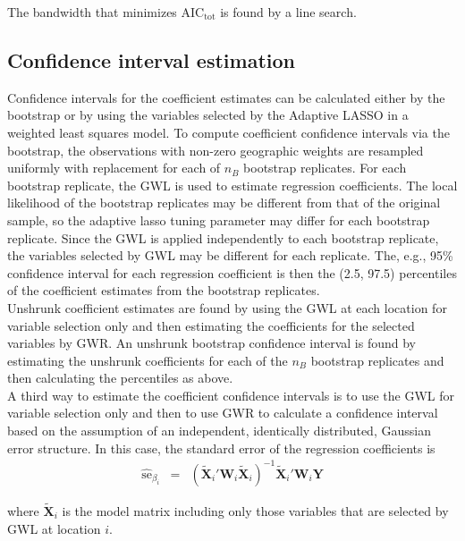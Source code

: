 \documentclass[authoryear, review, 11pt]{elsarticle}
\begin{document}
	The bandwidth that minimizes $\mbox{AIC}_{\mbox{tot}}$ is found by a line search.\\
	
	\subsection{Confidence interval estimation}
	 Confidence intervals for the coefficient estimates can be calculated either by the bootstrap \citep{Efron:1986} or by using the variables selected by the Adaptive LASSO in a weighted least squares model. To compute coefficient confidence intervals via the bootstrap, the observations with non-zero geographic weights are resampled uniformly with replacement for each of $n_B$ bootstrap replicates. For each bootstrap replicate, the GWL is used to estimate regression coefficients. The local likelihood of the bootstrap replicates may be different from that of the original sample, so the adaptive lasso tuning parameter may differ for each bootstrap replicate. Since the GWL is applied independently to each bootstrap replicate, the variables selected by GWL may be different for each replicate. The, e.g., 95\% confidence interval for each regression coefficient is then the (2.5, 97.5) percentiles of the coefficient estimates from the bootstrap replicates.\\
	 
	 Unshrunk coefficient estimates are found by using the GWL at each location for variable selection only and then estimating the coefficients for the selected variables by GWR. An unshrunk bootstrap confidence interval is found by estimating the unshrunk coefficients for each of the $n_B$ bootstrap replicates and then calculating the percentiles as above.\\
	 
	 A third way to estimate the coefficient confidence intervals is to use the GWL for variable selection only and then to use GWR to calculate a confidence interval based on the assumption of an independent, identically distributed, Gaussian error structure. In this case, the standard error of the regression coefficients is 
	 \begin{eqnarray}
		\hat{\mbox{se}}_{\beta_i} &=& \left( \tilde{\bm{X}}_i'\bm{W}_i \tilde{\bm{X}}_i \right)^{-1}  \tilde{\bm{X}}_i'\bm{W}_i\bm{Y}
	\end{eqnarray}
	
	where $\tilde{\bm{X}}_i$ is the model matrix including only those variables that are selected by GWL at location $i$.
\end{document}
